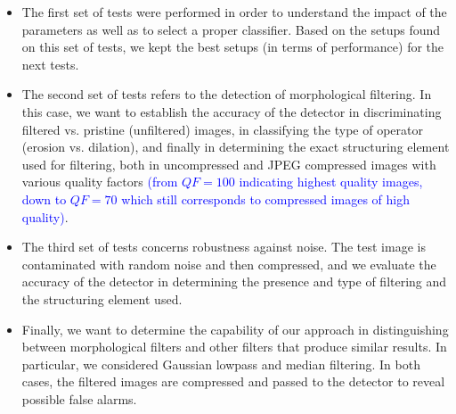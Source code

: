 \documentclass{ieeeaccess}
\newcommand{\revisedtext}[1]{\textcolor{blue}{#1}}
\begin{document}
\begin{itemize}
	\item The first set of tests were performed in order to understand the impact of the parameters as well as to select a proper classifier. Based on the setups found on this set of tests, we kept the best setups (in terms of performance) for the next tests.
	
	\item The second set of tests refers to the detection of morphological filtering. In this case, we want to establish the accuracy of the detector in discriminating filtered vs. pristine (unfiltered) images, in classifying the type of operator (erosion vs. dilation), and finally in determining the exact structuring element used for filtering, both in uncompressed and JPEG compressed images with various quality factors \revisedtext{(from $QF=100$ indicating highest quality images, down to $QF=70$ which still corresponds to compressed images of high quality)}. 
	
	\item The third set of tests concerns robustness against noise. The test image is contaminated with random noise and then compressed, and we evaluate the accuracy of the detector in determining the presence and type of filtering and the structuring element used.
	
	\item Finally, we want to determine the capability of our approach in distinguishing between morphological filters and other filters that produce similar results. In particular, we considered Gaussian lowpass and median filtering. In both cases, the filtered images are compressed and passed to the detector to reveal possible false alarms.
	
\end{itemize}
\end{document}
